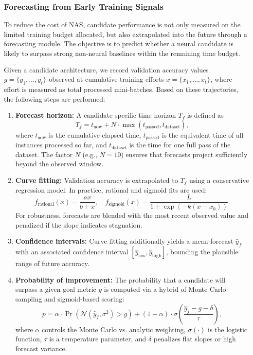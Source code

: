 \documentclass[stu,12pt,floatsintext,doublespacing]{apa7}
\begin{document}
\subsubsection{Forecasting from Early Training Signals}
\label{sec:forecasting_logic}

To reduce the cost of NAS, candidate performance is not only measured on the limited training budget allocated, but also extrapolated into the future through a forecasting module. The objective is to predict whether a neural candidate is likely to surpass strong non-neural baselines within the remaining time budget.

Given a candidate architecture, we record validation accuracy values $y = \{y_1, \dots, y_t\}$ observed at cumulative training efforts $x = \{x_1, \dots, x_t\}$, where effort is measured as total processed mini-batches. Based on these trajectories, the following steps are performed:

\begin{enumerate}
    \item \textbf{Forecast horizon:} A candidate-specific time horizon $T_f$ is defined as
    \[
    T_f = t_{\text{now}} + N \cdot \max(t_{\text{passed}}, t_{\text{dataset}}),
    \]
    where $t_{\text{now}}$ is the cumulative elapsed time, $t_{\text{passed}}$ is the equivalent time of all instances processed so far, and $t_{\text{dataset}}$ is the time for one full pass of the dataset. The factor $N$ (e.g., $N=10$) ensures that forecasts project sufficiently beyond the observed window.
    
    \item \textbf{Curve fitting:} Validation accuracy is extrapolated to $T_f$ using a conservative regression model. In practice, rational and sigmoid fits are used:
    \[
    f_{\text{rational}}(x) = \frac{a x}{b + x}, 
    \quad
    f_{\text{sigmoid}}(x) = \frac{L}{1 + \exp(-k(x-x_0))}.
    \]
    For robustness, forecasts are blended with the most recent observed value and penalized if the slope indicates stagnation.
    
    \item \textbf{Confidence intervals:} Curve fitting additionally yields a mean forecast $\hat{y}_f$ with an associated confidence interval $[\hat{y}_{\text{low}}, \hat{y}_{\text{high}}]$, bounding the plausible range of future accuracy.
    
    \item \textbf{Probability of improvement:} The probability that a candidate will surpass a given goal metric $g$ is computed via a hybrid of Monte Carlo sampling and sigmoid-based scoring:
    \[
    p = \alpha \cdot \Pr(\mathcal{N}(\hat{y}_f, \sigma^2) > g) + (1-\alpha) \cdot 
    \sigma\!\left(\frac{\hat{y}_f - g - \delta}{\tau}\right),
    \]
    where $\alpha$ controls the Monte Carlo vs. analytic weighting, $\sigma(\cdot)$ is the logistic function, $\tau$ is a temperature parameter, and $\delta$ penalizes flat slopes or high forecast variance.
\end{enumerate}
\end{document}
